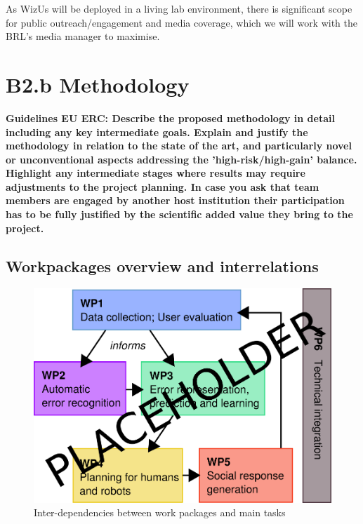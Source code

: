 \documentclass[11pt,a4paper]{report}
\newcommand{\project}{WizUs\xspace}
\newcommand{\eu}[1]{{\color{teal}\textbf{Guidelines EU ERC: #1}}}
\begin{document}
As \project will be deployed in a living lab environment, there is
significant scope for public outreach/engagement and media coverage,
which we will work with the BRL's media manager to maximise.

\chapter{B2.b Methodology}\label{research-methodology}

\eu{Describe the proposed methodology in detail including any key intermediate
goals. Explain and justify the methodology in relation to the state of the art,
and particularly novel or unconventional aspects addressing the
'high-risk/high-gain' balance. Highlight any intermediate stages where results
may require adjustments to the project planning. In case you ask that team
members are engaged by another host institution their participation has to be
fully justified by the scientific added value they bring to the project.}


\section{Workpackages overview and interrelations}\label{workpackage-interrelations}

\begin{figure}[!htbp]
    \centering
    \includegraphics[width=0.8\linewidth]{figs/wp-interrelations}
    \caption{Inter-dependencies between work packages and main tasks}
    \label{}
\end{figure}
\end{document}
